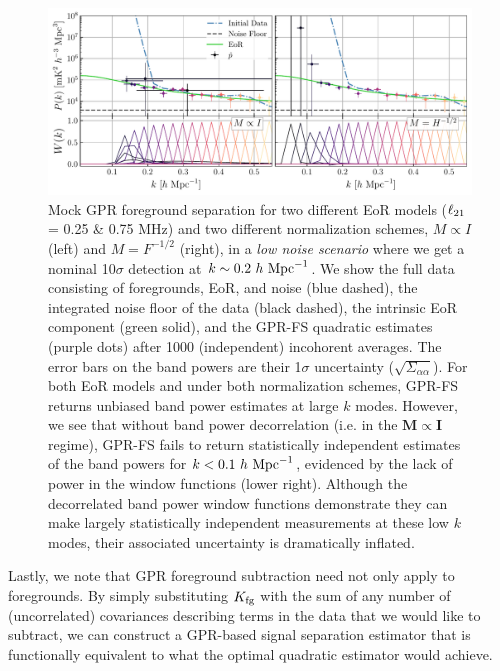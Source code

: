 \documentclass[a4paper,fleqn,usenatbib]{mnras}
\def\M{\boldsymbol{M}}
\def\I{\boldsymbol{I}}
\def\Kfg{K_{\rm fg}}
\def\ellto{\ell_{\rm 21}}
\begin{document}
\begin{figure}
\centering
\includegraphics[width=\linewidth]{imgs/gpr_window_low_noise_ell075.pdf}
\caption{Mock GPR foreground separation for two different EoR models ($\ellto$ = 0.25 \& 0.75 MHz) and two different normalization schemes, $M\propto I$ (left) and $M=F^{-1/2}$ (right), in a \emph{low noise scenario} where we get a nominal 10$\sigma$ detection at $k\sim0.2\ h\ {\rm Mpc}^{-1}$.
We show the full data consisting of foregrounds, EoR, and noise (blue dashed), the integrated noise floor of the data (black dashed), the intrinsic EoR component (green solid), and the GPR-FS quadratic estimates (purple dots) after 1000 (independent) incohorent averages.
The error bars on the band powers are their 1$\sigma$ uncertainty ($\sqrt{\Sigma_{\alpha\alpha}}$).
For both EoR models and under both normalization schemes, GPR-FS returns unbiased band power estimates at large $k$ modes.
However, we see that without band power decorrelation (i.e. in the $\M\propto\I$ regime), GPR-FS fails to return statistically independent estimates of the band powers for $k<0.1\ h\ {\rm Mpc}^{-1}$, evidenced by the lack of power in the window functions (lower right).
Although the decorrelated band power window functions demonstrate they can make largely statistically independent measurements at these low $k$ modes, their associated uncertainty is dramatically inflated.}
\label{fig:gpr_window_low_noise}
\end{figure}

Lastly, we note that GPR foreground subtraction need not only apply to foregrounds.
By simply substituting $\Kfg$ with the sum of any number of (uncorrelated) covariances describing terms in the data that we would like to subtract, we can construct a GPR-based signal separation estimator that is functionally equivalent to what the optimal quadratic estimator would achieve.
\end{document}

